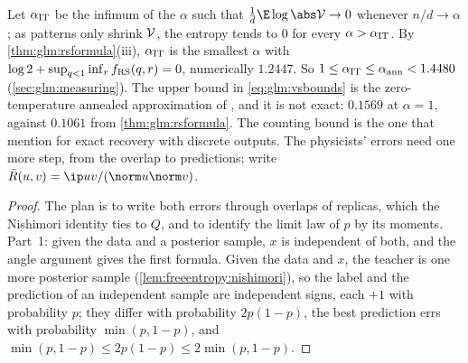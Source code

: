 \begin{refsection}
Let $\alpha_{\mathrm{IT}}$ be the infimum of the $\alpha$ such that $\frac1d\E\log\abs\glmV\to0$ whenever $n/d\to\alpha$; as patterns only shrink $\mathcal{V}$, the entropy tends to $0$ for every $\alpha>\alpha_{\mathrm{IT}}$. By \cref{thm:glm:rsformula}(iii), $\alpha_{\mathrm{IT}}$ is the smallest $\alpha$ with $\log2+\sup_{q<1}\inf_rf_{\mathrm{RS}}(q,r)=0$, numerically $1.2447$. So $1\le\alpha_{\mathrm{IT}}\le\alpha_{\mathrm{ann}}<1.4480$ (\cref{sec:glm:measuring}). The upper bound in \eqref{eq:glm:vsbounds} is the zero-temperature annealed approximation of \textcite{SeungSompolinskyTishby1992}, and it is not exact: $0.1569$ at $\alpha=1$, against $0.1061$ from \cref{thm:glm:rsformula}. The counting bound is the one that \textcite{BarbierEtAl2019} mention for exact recovery with discrete outputs. The physicists' errors need one more step, from the overlap to predictions; write $\bar R(u,v)=\ip uv/(\norm u\norm v)$.


\begin{proof}
The plan is to write both errors through overlaps of replicas, which the Nishimori identity ties to $Q$, and to identify the limit law of $p$ by its moments. Part~1: given the data and a posterior sample, $x$ is independent of both, and the angle argument gives the first formula. Given the data and $x$, the teacher is one more posterior sample (\cref{lem:freeentropy:nishimori}), so the label and the prediction of an independent sample are independent signs, each $+1$ with probability $p$; they differ with probability $2p(1-p)$, the best prediction errs with probability $\min(p,1-p)$, and $\min(p,1-p)\le2p(1-p)\le2\min(p,1-p)$.


\end{proof}
\end{refsection}
